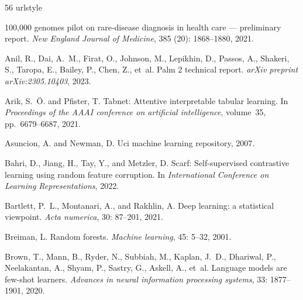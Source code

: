 \documentclass{article}
\theoremstyle{plain}
\theoremstyle{definition}
\theoremstyle{remark}
\begin{document}
\begin{thebibliography}{56}
\providecommand{\natexlab}[1]{#1}
\providecommand{\url}[1]{\texttt{#1}}
\expandafter\ifx\csname urlstyle\endcsname\relax
  \providecommand{\doi}[1]{doi: #1}\else
  \providecommand{\doi}{doi: \begingroup \urlstyle{rm}\Url}\fi

100,000 genomes pilot on rare-disease diagnosis in health care — preliminary
  report.
\newblock \emph{New England Journal of Medicine}, 385 (20):
  1868--1880, 2021.

Anil, R., Dai, A.~M., Firat, O., Johnson, M., Lepikhin, D., Passos, A.,
  Shakeri, S., Taropa, E., Bailey, P., Chen, Z., et~al.
\newblock Palm 2 technical report.
\newblock \emph{arXiv preprint arXiv:2305.10403}, 2023.

Arik, S.~{\"O}. and Pfister, T.
\newblock Tabnet: Attentive interpretable tabular learning.
\newblock In \emph{Proceedings of the AAAI conference on artificial
  intelligence}, volume~35, pp.\  6679--6687, 2021.

Asuncion, A. and Newman, D.
\newblock Uci machine learning repository, 2007.

Bahri, D., Jiang, H., Tay, Y., and Metzler, D.
\newblock Scarf: Self-supervised contrastive learning using random feature
  corruption.
\newblock In \emph{International Conference on Learning Representations}, 2022.

Bartlett, P.~L., Montanari, A., and Rakhlin, A.
\newblock Deep learning: a statistical viewpoint.
\newblock \emph{Acta numerica}, 30: 87--201, 2021.

Breiman, L.
\newblock Random forests.
\newblock \emph{Machine learning}, 45: 5--32, 2001.

Brown, T., Mann, B., Ryder, N., Subbiah, M., Kaplan, J.~D., Dhariwal, P.,
  Neelakantan, A., Shyam, P., Sastry, G., Askell, A., et~al.
\newblock Language models are few-shot learners.
\newblock \emph{Advances in neural information processing systems},
  33: 1877--1901, 2020.


\end{thebibliography}
\end{document}
